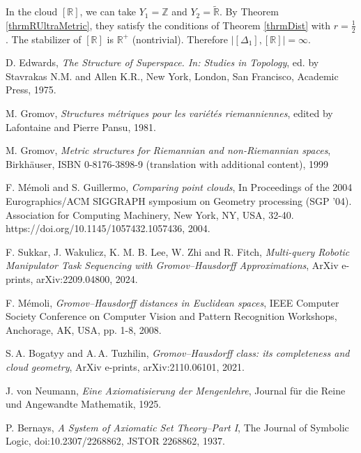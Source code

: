 \documentclass[leqno]{article}
\begin{document}
\begin{corollary}
  In the cloud $[\mathbb{R}]$, we can take $Y_{1} = \mathbb{Z}$ and
  $Y_{2} = \widetilde{\mathbb{R}}$. By Theorem
  \ref{thrmRUltraMetric}, they satisfy the conditions of Theorem
  \ref{thrmDist} with $r = \frac{1}{2}$. The stabilizer of
  $[\mathbb{R}]$ is $\mathbb{R}^{+}$ (nontrivial). Therefore
  $\big|[\Delta_{1}],[\mathbb{R}]\big| = \infty$.
\end{corollary}

\begin{thebibliography}{99}

   D. Edwards, \emph{The Structure of Superspace.
  In: Studies in Topology}, ed. by Stavrakas N.M. and Allen K.R., New
  York, London, San Francisco, Academic Press, 1975.

   M. Gromov, \emph{Structures m\'etriques pour les
  vari\'et\'es riemanniennes}, edited by Lafontaine and Pierre Pansu, 1981.

   M. Gromov, \emph{Metric structures for
  Riemannian and non-Riemannian spaces}, Birkh\"auser, ISBN
  0-8176-3898-9 (translation with additional content), 1999

  F. M\'emoli and S. Guillermo, \emph{Comparing point clouds}, In
  Proceedings of the 2004 Eurographics/ACM SIGGRAPH symposium on
  Geometry processing (SGP '04). Association for Computing Machinery,
  New York, NY, USA, 32-40. https://doi.org/10.1145/1057432.1057436, 2004.

   F. Sukkar, J. Wakulicz, K. M. B. Lee, W. Zhi and
  R. Fitch, \emph{Multi-query Robotic Manipulator Task Sequencing
  with Gromov--Hausdorff Approximations}, ArXiv e-prints,
  arXiv:2209.04800, 2024.

  F. M\'emoli, \emph{Gromov--Hausdorff distances in Euclidean
  spaces}, IEEE Computer Society Conference on Computer Vision and
  Pattern Recognition Workshops, Anchorage, AK, USA, pp. 1-8, 2008.

  S.\,A. Bogatyy and A.\,A. Tuzhilin, \emph{Gromov--Hausdorff class:
  its completeness and cloud geometry}, ArXiv e-prints,
  arXiv:2110.06101, 2021.

  J. von Neumann, \emph{Eine Axiomatisierung der Mengenlehre},
  Journal f\"ur die Reine und Angewandte Mathematik, 1925.

  P. Bernays, \emph{A System of Axiomatic Set Theory--Part I}, The
  Journal of Symbolic Logic, doi:10.2307/2268862, JSTOR 2268862, 1937.


\end{thebibliography}
\end{document}
